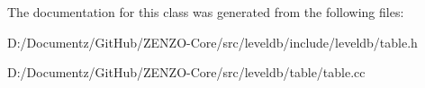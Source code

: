 The documentation for this class was generated from the following files\+:\begin{DoxyCompactItemize}
\item 
D\+:/\+Documentz/\+Git\+Hub/\+Z\+E\+N\+Z\+O-\/\+Core/src/leveldb/include/leveldb/table.\+h\item 
D\+:/\+Documentz/\+Git\+Hub/\+Z\+E\+N\+Z\+O-\/\+Core/src/leveldb/table/table.\+cc\end{DoxyCompactItemize}
